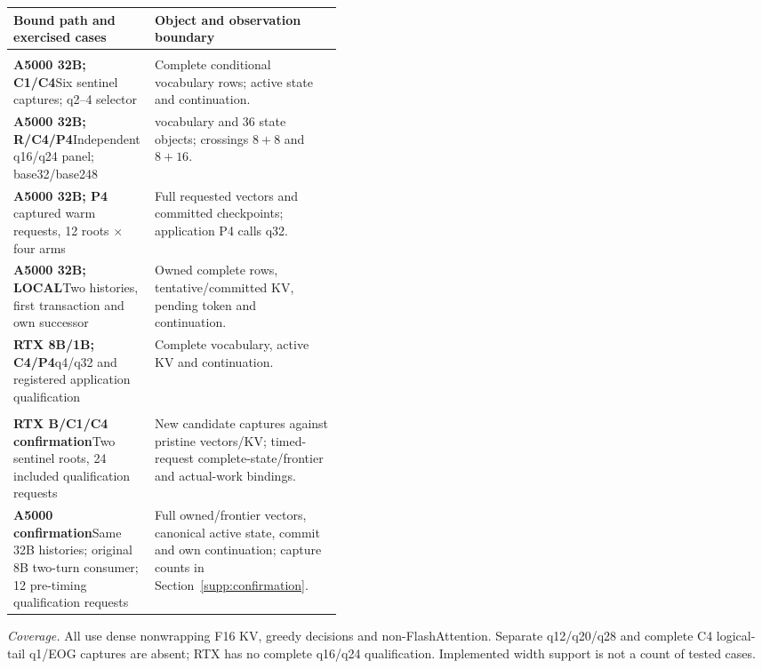 \begingroup
\fontsize{8.7}{10.5}\selectfont
\setlength{\tabcolsep}{3.5pt}\renewcommand{\arraystretch}{1.03}
\noindent
\begin{tabularx}{\linewidth}{@{}>{\raggedright\arraybackslash}p{0.43\linewidth}>{\raggedright\arraybackslash}X@{}}
\toprule
Bound path and exercised cases & Object and observation boundary\\
\midrule
\multicolumn{2}{@{}l}{\textbf{Original path qualifications}}\\
\textbf{A5000 32B; C1/C4}\newline Six sentinel captures; q2--4 selector & Complete conditional vocabulary rows; active state and continuation.\\
\addlinespace[2.5pt]
\textbf{A5000 32B; R/C4/P4}\newline Independent q16/q24 panel; base32/base248 & 264 vocabulary and 36 state objects; crossings $8+8$ and $8+16$.\\
\addlinespace[2.5pt]
\textbf{A5000 32B; P4}\newline 48 captured warm requests, 12 roots $\times$ four arms & Full requested vectors and committed checkpoints; application P4 calls q32.\\
\addlinespace[2.5pt]
\textbf{A5000 32B; LOCAL}\newline Two histories, first transaction and own successor & Owned complete rows, tentative/committed KV, pending token and continuation.\\
\addlinespace[2.5pt]
\textbf{RTX 8B/1B; C4/P4}\newline q4/q32 and registered application qualification & Complete vocabulary, active KV and continuation.\\
\midrule
\multicolumn{2}{@{}l}{\textbf{Confirmation studies}}\\
\textbf{RTX B/C1/C4 confirmation}\newline Two sentinel roots, 24 included qualification requests & New candidate captures against pristine vectors/KV; timed-request complete-state/frontier and actual-work bindings.\\
\addlinespace[2.5pt]
\textbf{A5000 confirmation}\newline Same 32B histories; original 8B two-turn consumer; 12 pre-timing qualification requests & Full owned/frontier vectors, canonical active state, commit and own continuation; capture counts in Section~\ref{supp:confirmation}.\\
\bottomrule
\end{tabularx}
\par\smallskip
\fontsize{8}{9.6}\selectfont\raggedright
\textit{Coverage.} All use dense nonwrapping F16 KV, greedy decisions and non-FlashAttention. Separate q12/q20/q28 and complete C4 logical-tail q1/EOG captures are absent; RTX has no complete q16/q24 qualification. Implemented width support is not a count of tested cases.
\par\endgroup
